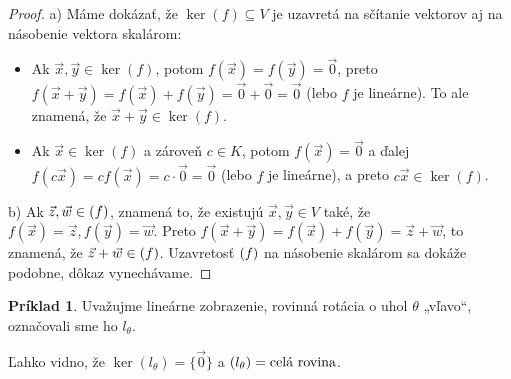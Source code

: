 \documentclass[11pt,a4paper]{article}
\theoremstyle{definition}
\newtheorem{priklad}[definicia]{Príklad}
\theoremstyle{plain}
\theoremstyle{remark}
\let\Im\relax
\DeclareMathOperator{\Im}{Im}
\begin{document}
\begin{proof}
a) Máme dokázať, že $\ker(f) \subseteq V$ je uzavretá na sčítanie vektorov aj na násobenie vektora skalárom:
\begin{itemize}
    \item Ak $\vec{x}, \vec{y} \in \ker(f)$, potom $f(\vec{x}) = f(\vec{y}) = \vec{0}$, preto $f(\vec{x} + \vec{y}) = f(\vec{x}) + f(\vec{y}) = \vec{0} + \vec{0} = \vec{0}$ (lebo $f$ je lineárne). To ale znamená, že $\vec{x} + \vec{y} \in \ker(f)$.
    \item Ak $\vec{x} \in \ker(f)$ a zároveň $c \in K$, potom $f(\vec{x}) = \vec{0}$ a ďalej $f(c\vec{x}) = cf(\vec{x}) = c \cdot \vec{0} = \vec{0}$ (lebo $f$ je lineárne), a preto $c\vec{x} \in \ker(f)$.
\end{itemize}
b) Ak $\vec{z}, \vec{w} \in \Im(f)$, znamená to, že existujú $\vec{x}, \vec{y} \in V$ také, že $f(\vec{x}) = \vec{z}, f(\vec{y}) = \vec{w}$. Preto $f(\vec{x} + \vec{y}) = f(\vec{x}) + f(\vec{y}) = \vec{z} + \vec{w}$, to znamená, že $\vec{z} + \vec{w} \in \Im(f)$. Uzavretosť $\Im(f)$ na násobenie skalárom sa dokáže podobne, dôkaz vynechávame.
\end{proof}

\begin{priklad} \label{ex:rotacia}
Uvažujme lineárne zobrazenie, rovinná rotácia o uhol $\theta$ „vľavo“, označovali sme ho $l_{\theta}$.

\begin{center}
\end{center}

Ľahko vidno, že $\ker(l_{\theta}) = \{ \vec{0} \}$ a $\Im(l_{\theta}) = \text{celá rovina}$.
\end{priklad}
\end{document}
